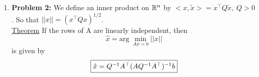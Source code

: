 \documentclass[letterpaper]{article}
\begin{document}
\begin{enumerate}
\begin{enumerate}
\item We have 2 constraints, and thus
$$ \left[\begin{array}{cccc}  <t, t> & <t, \sin(\pi t)>\\
<t, \sin(\pi t)> & <\sin(\pi t), \sin(\pi t)>\end{array} \right]  \left[\begin{array}{c} \beta_1 \\ \beta_2 \end{array} \right] =  \left[\begin{array}{c} 2 \\ \pi \end{array} \right] $$
$$\begin{aligned}
<t,t>&=\frac{8}{3}~~~~~~\text{from part(a)} \\
<t,\sin(\pi t)> &= \int_0^{2} \tau \sin(\pi \tau) d \tau = -\frac{2}{\pi}\\
<\sin(\pi t),\sin(\pi t)>&=\int_0^{2}\sin^2 (\pi \tau) d \tau = 1
\end{aligned}$$
$$\therefore
\left[\begin{array}{rr} \dfrac{8}{3} &-\dfrac{2}{\pi} \\[2ex]
-\dfrac{2}{\pi} & 1\end{array}\right]
\left[\begin{array}{c}\beta_1 \\ \beta_2\end{array}\right]
=\left[\begin{array}{c}2 \\ \pi\end{array}\right]$$

$$\begin{aligned}
\beta_1&=\frac{3 \pi^2}{2 \pi^2 - 3} \\
\beta_2&=\frac{\pi (2 \pi^2+3)}{2 \pi^2 -3} \\
f^{*}&=\frac{3 \pi^2}{2 \pi^2-3}t+\frac{\pi(2 \pi^2+3)}{2 \pi^2-3}\sin(\pi t)
\end{aligned}$$
\end{enumerate}

\newpage
\item \noindent \textbf{Problem 2:} We define an inner product on $\mathbb R^n$ by $<x, \tilde{x}> = x^\top Q \tilde{x}, ~ Q>0$. So that $||x|| = (x^\top Q x)^{1/2}$.\\

\underline{Theorem} If the rows of A are linearly independent, then
$$\hat{x} = \mathrm{arg}~\min_{Ax = b} ||x||$$
is given by
$$\fbox{$\hat{x} = Q^{-1} A^\top (AQ^{-1}A^\top)^{-1} b$} $$


\end{enumerate}
\end{document}
